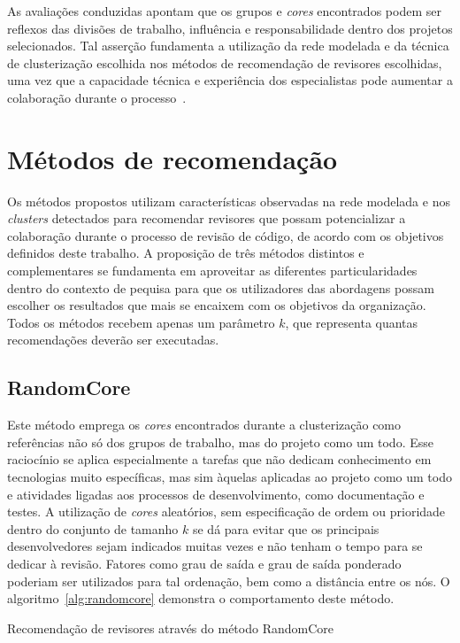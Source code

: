 \documentclass[12pt,openany,oneside,a4paper,english,brazil]{abntbibufjf}
\begin{document}
As avaliações conduzidas apontam que os grupos e \textit{cores} encontrados podem ser reflexos das divisões de trabalho, influência e responsabilidade dentro dos projetos selecionados. Tal asserção fundamenta a utilização da rede modelada e da técnica de clusterização escolhida nos métodos de recomendação de revisores escolhidas, uma vez que a capacidade técnica e experiência dos especialistas pode aumentar a colaboração durante o processo~\cite{Bosu2014, kovalenko2018}.


\section{Métodos de recomendação}
  Os métodos propostos utilizam características observadas na rede modelada e nos \textit{clusters} detectados para recomendar revisores que possam potencializar a colaboração durante o processo de revisão de código, de acordo com os objetivos definidos deste trabalho. A proposição de três métodos distintos e complementares se fundamenta em aproveitar as diferentes particularidades dentro do contexto de pequisa para que os utilizadores das abordagens possam escolher os resultados que mais se encaixem com os objetivos da organização. Todos os métodos recebem apenas um parâmetro $k$, que representa quantas recomendações deverão ser executadas.

  \subsection{RandomCore}
    Este método emprega os \textit{cores} encontrados durante a clusterização como referências não só dos grupos de trabalho, mas do projeto como um todo. Esse raciocínio se aplica especialmente a tarefas que não dedicam conhecimento em tecnologias muito específicas, mas sim àquelas aplicadas ao projeto como um todo e atividades ligadas aos processos de desenvolvimento, como documentação e testes. A utilização de \textit{cores} aleatórios, sem especificação de ordem ou prioridade dentro do conjunto de tamanho $k$ se dá para evitar que os principais desenvolvedores sejam indicados muitas vezes e não tenham o tempo para se dedicar à revisão. Fatores como grau de saída e grau de saída ponderado poderiam ser utilizados para tal ordenação, bem como a distância entre os nós. O algoritmo~\ref{alg:randomcore} demonstra o comportamento deste método.


\begin{algorithm}
\label{alg:randomcore}
 \caption{Recomendação de revisores através do método RandomCore}

\end{algorithm}
\end{document}
